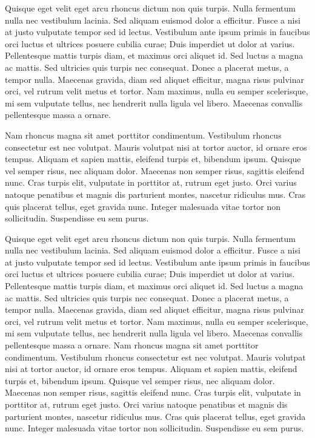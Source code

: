 \documentclass[a4paper]{article}
\begin{document}
    \begin{answer}
        Quisque eget velit eget arcu rhoncus dictum non quis turpis. Nulla fermentum nulla nec vestibulum lacinia. Sed aliquam euismod dolor a efficitur. Fusce a nisi at justo vulputate tempor sed id lectus. Vestibulum ante ipsum primis in faucibus orci luctus et ultrices posuere cubilia curae; Duis imperdiet ut dolor at varius. Pellentesque mattis turpis diam, et maximus orci aliquet id. Sed luctus a magna ac mattis. Sed ultricies quis turpis nec consequat. Donec a placerat metus, a tempor nulla. Maecenas gravida, diam sed aliquet efficitur, magna risus pulvinar orci, vel rutrum velit metus et tortor. Nam maximus, nulla eu semper scelerisque, mi sem vulputate tellus, nec hendrerit nulla ligula vel libero. Maecenas convallis pellentesque massa a ornare.

        Nam rhoncus magna sit amet porttitor condimentum. Vestibulum rhoncus consectetur est nec volutpat. Mauris volutpat nisi at tortor auctor, id ornare eros tempus. Aliquam et sapien mattis, eleifend turpis et, bibendum ipsum. Quisque vel semper risus, nec aliquam dolor. Maecenas non semper risus, sagittis eleifend nunc. Cras turpis elit, vulputate in porttitor at, rutrum eget justo. Orci varius natoque penatibus et magnis dis parturient montes, nascetur ridiculus mus. Cras quis placerat tellus, eget gravida nunc. Integer malesuada vitae tortor non sollicitudin. Suspendisse eu sem purus.
    \end{answer}

    \begin{answer}
        Quisque eget velit eget arcu rhoncus dictum non quis turpis. Nulla fermentum nulla nec vestibulum lacinia. Sed aliquam euismod dolor a efficitur. Fusce a nisi at justo vulputate tempor sed id lectus. Vestibulum ante ipsum primis in faucibus orci luctus et ultrices posuere cubilia curae; Duis imperdiet ut dolor at varius. Pellentesque mattis turpis diam, et maximus orci aliquet id. Sed luctus a magna ac mattis. Sed ultricies quis turpis nec consequat. Donec a placerat metus, a tempor nulla. Maecenas gravida, diam sed aliquet efficitur, magna risus pulvinar orci, vel rutrum velit metus et tortor. Nam maximus, nulla eu semper scelerisque, mi sem vulputate tellus, nec hendrerit nulla ligula vel libero. Maecenas convallis pellentesque massa a ornare.
        Nam rhoncus magna sit amet porttitor condimentum. Vestibulum rhoncus consectetur est nec volutpat. Mauris volutpat nisi at tortor auctor, id ornare eros tempus. Aliquam et sapien mattis, eleifend turpis et, bibendum ipsum. Quisque vel semper risus, nec aliquam dolor. Maecenas non semper risus, sagittis eleifend nunc. Cras turpis elit, vulputate in porttitor at, rutrum eget justo. Orci varius natoque penatibus et magnis dis parturient montes, nascetur ridiculus mus. Cras quis placerat tellus, eget gravida nunc. Integer malesuada vitae tortor non sollicitudin. Suspendisse eu sem purus.
    \end{answer}
\end{document}
